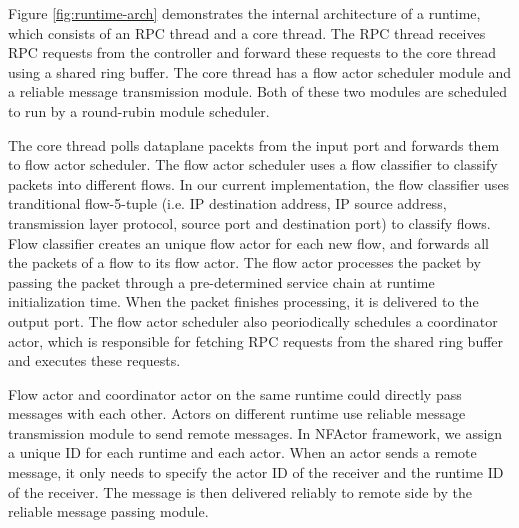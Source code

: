 
Figure \ref{fig:runtime-arch} demonstrates the internal architecture of a runtime, which consists of an RPC thread and a core thread. The RPC thread receives RPC requests from the controller and forward these requests to the core thread using a shared ring buffer. The core thread has a flow actor scheduler module and a reliable message transmission module. Both of these two modules are scheduled to run by a round-rubin module scheduler.


The core thread polls dataplane pacekts from the input port and forwards them to flow actor scheduler. The flow actor scheduler uses a flow classifier to classify packets into different flows. In our current implementation, the flow classifier uses tranditional flow-5-tuple (i.e. IP destination address, IP source address, transmission layer protocol, source port and destination port) to classify flows. Flow classifier creates an unique flow actor for each new flow, and forwards all the packets of a flow to its flow actor. The flow actor processes the packet by passing the packet through a pre-determined service chain at runtime initialization time. When the packet finishes processing, it is delivered to the output port. The flow actor scheduler also peoriodically schedules a coordinator actor, which is responsible for fetching RPC requests from the shared ring buffer and executes these requests.

Flow actor and coordinator actor on the same runtime could directly pass messages with each other. Actors on different runtime use reliable message transmission module to send remote messages. In NFActor framework, we assign a unique ID for each runtime and each actor. When an actor sends a remote message, it only needs to specify the actor ID of the receiver and the runtime ID of the receiver. The message is then delivered reliably to remote side by the reliable message passing module.


